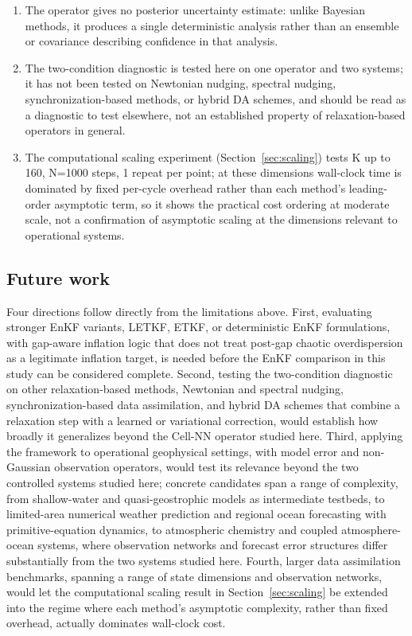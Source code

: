 \documentclass[final,5p,times,twocolumn,authoryear]{elsarticle}
\begin{document}
\begin{enumerate}
covariance rather than isotropic, might narrow this margin further;
we have not tested either.
\item The operator gives no posterior uncertainty estimate: unlike
Bayesian methods, it produces a single deterministic analysis rather
than an ensemble or covariance describing confidence in that
analysis.
\item The two-condition diagnostic is tested here on one operator and
two systems; it has not been tested on Newtonian nudging, spectral
nudging, synchronization-based methods, or hybrid DA schemes, and
should be read as a diagnostic to test elsewhere, not an established
property of relaxation-based operators in general.
\item The computational scaling experiment (Section~\ref{sec:scaling})
tests K up to 160, N=1000 steps, 1 repeat per point; at these
dimensions wall-clock time is dominated by fixed per-cycle overhead
rather than each method's leading-order asymptotic term, so it shows
the practical cost ordering at moderate scale, not a confirmation of
asymptotic scaling at the dimensions relevant to operational systems.
\end{enumerate}

\subsection{Future work}
\label{sec:future}

Four directions follow directly from the limitations above. First,
evaluating stronger EnKF variants, LETKF, ETKF, or deterministic
EnKF formulations, with gap-aware inflation logic that does not treat
post-gap chaotic overdispersion as a legitimate inflation target, is
needed before the EnKF comparison in this study can be considered
complete. Second, testing the two-condition diagnostic on other
relaxation-based methods, Newtonian and spectral nudging,
synchronization-based data assimilation, and hybrid DA schemes that
combine a relaxation step with a learned or variational correction,
would establish how broadly it generalizes beyond the Cell-NN
operator studied here. Third, applying the framework to operational
geophysical settings, with model error and non-Gaussian observation
operators, would test its relevance beyond the two controlled systems
studied here; concrete candidates span a range of complexity, from
shallow-water and quasi-geostrophic models as intermediate testbeds,
to limited-area numerical weather prediction and regional ocean
forecasting with primitive-equation dynamics, to atmospheric
chemistry and coupled atmosphere-ocean systems, where observation
networks and forecast error structures differ substantially from the
two systems studied here. Fourth, larger data assimilation
benchmarks, spanning a range of state dimensions and observation
networks, would let the computational scaling result in
Section~\ref{sec:scaling} be extended into the regime where each
method's asymptotic complexity, rather than fixed overhead, actually
dominates wall-clock cost.
\end{document}
